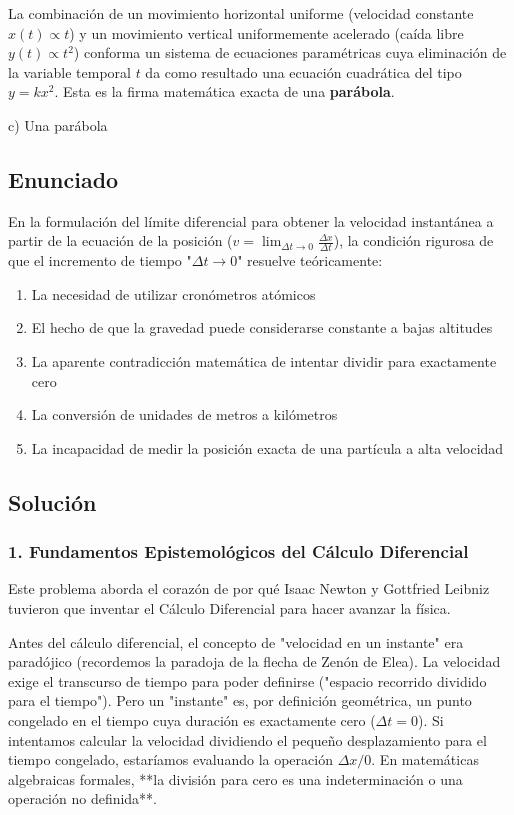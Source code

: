 \documentclass[12pt, a4paper]{article}
\begin{document}
La combinación de un movimiento horizontal uniforme (velocidad constante $x(t) \propto t$) y un movimiento vertical uniformemente acelerado (caída libre $y(t) \propto t^2$) conforma un sistema de ecuaciones paramétricas cuya eliminación de la variable temporal $t$ da como resultado una ecuación cuadrática del tipo $y = k x^2$. Esta es la firma matemática exacta de una \textbf{parábola}.

\begin{tcolorbox}[colback=green!5!white, colframe=green!50!black, title=Respuesta Final]
\centering \Large c) Una parábola
\end{tcolorbox}

\newpage

\subsection*{Enunciado}
En la formulación del límite diferencial para obtener la velocidad instantánea a partir de la ecuación de la posición ($v = \lim_{\Delta t \to 0} \frac{\Delta x}{\Delta t}$), la condición rigurosa de que el incremento de tiempo "$\Delta t \to 0$" resuelve teóricamente:
\begin{enumerate}[label=\alph*)]
    \item La necesidad de utilizar cronómetros atómicos
    \item El hecho de que la gravedad puede considerarse constante a bajas altitudes
    \item La aparente contradicción matemática de intentar dividir para exactamente cero
    \item La conversión de unidades de metros a kilómetros
    \item La incapacidad de medir la posición exacta de una partícula a alta velocidad
\end{enumerate}

\subsection*{Solución}

\subsubsection*{1. Fundamentos Epistemológicos del Cálculo Diferencial}
Este problema aborda el corazón de por qué Isaac Newton y Gottfried Leibniz tuvieron que inventar el Cálculo Diferencial para hacer avanzar la física.

Antes del cálculo diferencial, el concepto de "velocidad en un instante" era paradójico (recordemos la paradoja de la flecha de Zenón de Elea). 
La velocidad exige el transcurso de tiempo para poder definirse ("espacio recorrido dividido para el tiempo"). Pero un "instante" es, por definición geométrica, un punto congelado en el tiempo cuya duración es exactamente cero ($\Delta t = 0$). 
Si intentamos calcular la velocidad dividiendo el pequeño desplazamiento para el tiempo congelado, estaríamos evaluando la operación $\Delta x / 0$. En matemáticas algebraicas formales, **la división para cero es una indeterminación o una operación no definida**.
\end{document}
